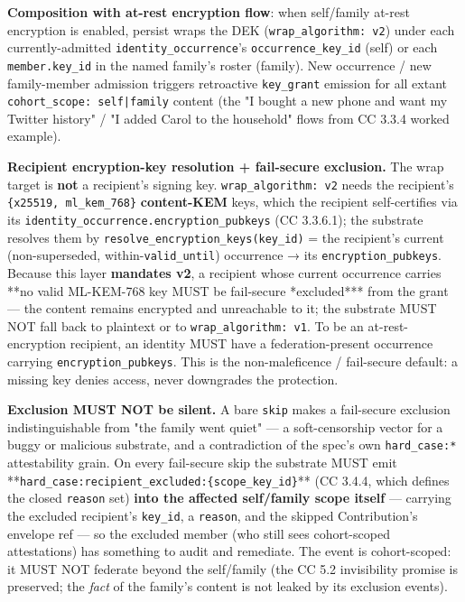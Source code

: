 \documentclass[11pt]{article}
\begin{document}
\textbf{Composition with at-rest encryption flow}: when self/family at-rest encryption is enabled, persist wraps the DEK (\texttt{wrap\_algorithm: v2}) under each currently-admitted \texttt{identity\_occurrence}'s \texttt{occurrence\_key\_id} (self) or each \texttt{member.key\_id} in the named family's roster (family). New occurrence / new family-member admission triggers retroactive \texttt{key\_grant} emission for all extant \texttt{cohort\_scope: self|family} content (the "I bought a new phone and want my Twitter history" / "I added Carol to the household" flows from CC 3.3.4 worked example).


\textbf{Recipient encryption-key resolution + fail-secure exclusion.} The wrap target is \textbf{not} a recipient's signing key. \texttt{wrap\_algorithm: v2} needs the recipient's \texttt{\{x25519, ml\_kem\_768\}} \textbf{content-KEM} keys, which the recipient self-certifies via its \texttt{identity\_occurrence.encryption\_pubkeys} (CC 3.3.6.1); the substrate resolves them by \texttt{resolve\_encryption\_keys(key\_id)} = the recipient's current (non-superseded, within-\texttt{valid\_until}) occurrence → its \texttt{encryption\_pubkeys}. Because this layer \textbf{mandates v2}, a recipient whose current occurrence carries **no valid ML-KEM-768 key MUST be fail-secure *excluded*** from the grant — the content remains encrypted and unreachable to it; the substrate MUST NOT fall back to plaintext or to \texttt{wrap\_algorithm: v1}. To be an at-rest-encryption recipient, an identity MUST have a federation-present occurrence carrying \texttt{encryption\_pubkeys}. This is the non-maleficence / fail-secure default: a missing key denies access, never downgrades the protection.


\textbf{Exclusion MUST NOT be silent.} A bare \texttt{skip} makes a fail-secure exclusion indistinguishable from "the family went quiet" — a soft-censorship vector for a buggy or malicious substrate, and a contradiction of the spec's own \texttt{hard\_case:*} attestability grain. On every fail-secure skip the substrate MUST emit **\texttt{hard\_case:recipient\_excluded:\{scope\_key\_id\}}** (CC 3.4.4, which defines the closed \texttt{reason} set) \textbf{into the affected self/family scope itself} — carrying the excluded recipient's \texttt{key\_id}, a \texttt{reason}, and the skipped Contribution's envelope ref — so the excluded member (who still sees cohort-scoped attestations) has something to audit and remediate. The event is cohort-scoped: it MUST NOT federate beyond the self/family (the CC 5.2 invisibility promise is preserved; the \textit{fact} of the family's content is not leaked by its exclusion events).
\end{document}
